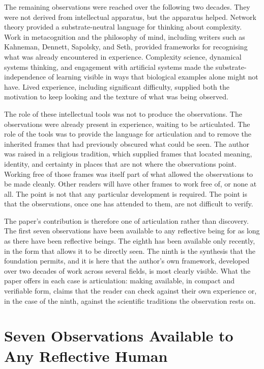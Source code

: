 \documentclass[11pt]{article}
\begin{document}
The remaining observations were reached over the following two decades. 
They were not derived from intellectual apparatus, but the apparatus 
helped. Network theory provided a substrate-neutral language for 
thinking about complexity. Work in metacognition and the philosophy of 
mind, including writers such as Kahneman, Dennett, Sapolsky, and Seth, 
provided frameworks for recognising what was already encountered in 
experience. Complexity science, dynamical systems thinking, and 
engagement with artificial systems made the substrate-independence of 
learning visible in ways that biological examples alone might not have. 
Lived experience, including significant difficulty, supplied both the 
motivation to keep looking and the texture of what was being observed.

The role of these intellectual tools was not to produce the observations. 
The observations were already present in experience, waiting to be 
articulated. The role of the tools was to provide the language for 
articulation and to remove the inherited frames that had previously 
obscured what could be seen. The author was raised in a religious 
tradition, which supplied frames that located meaning, identity, and 
certainty in places that are not where the observations point. Working 
free of those frames was itself part of what allowed the observations 
to be made cleanly. Other readers will have other frames to work free 
of, or none at all. The point is not that any particular development is 
required. The point is that the observations, once one has attended to 
them, are not difficult to verify.

The paper's contribution is therefore one of articulation rather than 
discovery. The first seven observations have been available to any 
reflective being for as long as there have been reflective beings. The 
eighth has been available only recently, in the form that allows it to 
be directly seen. The ninth is the synthesis that the foundation 
permits, and it is here that the author's own framework, developed over 
two decades of work across several fields, is most clearly visible. 
What the paper offers in each case is articulation: making available, 
in compact and verifiable form, claims that the reader can check 
against their own experience or, in the case of the ninth, against the 
scientific traditions the observation rests on.

\section{Seven Observations Available to Any Reflective Human}
\end{document}
